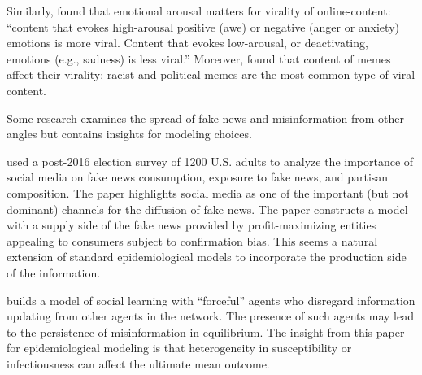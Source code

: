 Similarly, \href{https://journals.sagepub.com/doi/10.1509/jmr.10.0353}{\cite{berger2012makes}} found that emotional arousal matters for virality of online-content: ``content that evokes high-arousal positive (awe) or negative (anger or anxiety) emotions is more viral. Content that evokes low-arousal, or deactivating, emotions (e.g., sadness) is less viral.'' Moreover,  \href{https://arxiv.org/abs/1805.12512}{\cite{zannettou2018origins}} found that content of memes affect their virality: racist and political memes are the most common type of viral content.


Some research examines the spread of fake news and misinformation from other angles but contains insights for modeling choices.

\href{https://github.com/iworld1991/EpiExp/blob/master/Literature/allcott2017social.pdf}{\cite{allcott2017social}} used a post-2016 election survey of 1200 U.S. adults to analyze the importance of social media on fake news consumption, exposure to fake news, and partisan composition. The paper highlights social media as one of the important (but not dominant) channels for the diffusion of fake news.  The paper  constructs a model with a supply side of the fake news provided by profit-maximizing entities appealing to consumers subject to confirmation bias. This seems a natural extension of standard epidemiological models to incorporate the production side of the information.

\href{https://www.kdd.org/exploration_files/8._CR.10.Misinformation_in_social_media_-_Final.pdf}{\cite{acemoglu2010spread}} builds a model of social learning with ``forceful'' agents who disregard information updating from other agents in the network. The presence of such agents may lead to the persistence of misinformation in equilibrium. The insight from this paper for epidemiological modeling is that heterogeneity in susceptibility or infectiousness can affect the ultimate mean outcome.

